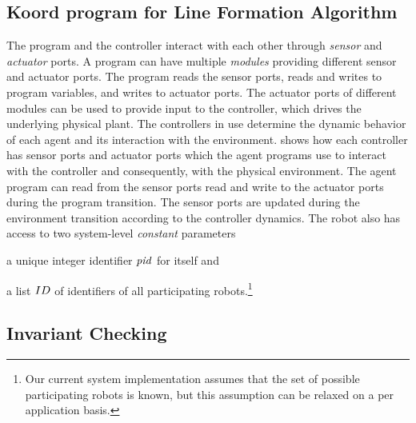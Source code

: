 
\subsection{Koord program for Line Formation Algorithm}


The program and the controller interact with each other through \emph{sensor} and \emph{actuator} ports.
A \lgname program can have multiple \emph{modules} providing different sensor and actuator ports.
The program reads the sensor ports, reads and writes to program variables, and writes to actuator ports.
The actuator ports of different modules can be used to provide input to the controller, which drives the underlying physical plant.
The controllers in use determine the dynamic behavior of each agent and its interaction with the environment.
 shows how each controller has sensor ports and actuator ports which the agent programs use to interact with the controller and consequently, with the physical environment.
The agent program can read from the sensor ports read and write to the actuator ports during the program transition.
The sensor ports are updated during the environment transition according to the controller dynamics.
%
The robot also has access to two system-level \emph{constant} parameters

\begin{inparaenum}[(a)]
\item a unique integer identifier $\mathit{pid}$ for itself and
\item a list $ID$ of identifiers of all participating robots.\footnote{Our current system implementation assumes that the set of possible participating robots is known, but this assumption can be relaxed on a per application basis.}
\end{inparaenum}



\subsection{Invariant Checking}


